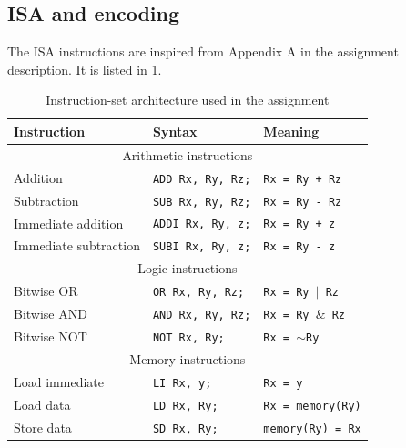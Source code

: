 \documentclass[a4paper, english]{article}
\numberwithin{equation}{section}
\begin{document}
\subsection{ISA and encoding}\label{sec:isa}
The ISA instructions are inspired from Appendix A in the assignment description. It is listed in \cref{tbl:ISA}.
\begin{table}[H]
    \centering
    \caption{Instruction-set architecture used in the assignment}\label{tbl:ISA}
    \begin{tabular}{lll}
        \toprule
        \textbf{Instruction}  & \textbf{Syntax}          & \textbf{Meaning}                  \\
        \midrule
        \multicolumn{3}{c}{Arithmetic instructions}                                          \\
        \midrule
        Addition              & \texttt{ADD Rx, Ry, Rz;} & \texttt{Rx = Ry + Rz}             \\
        Subtraction           & \texttt{SUB Rx, Ry, Rz;} & \texttt{Rx = Ry - Rz}             \\
        Immediate addition    & \texttt{ADDI Rx, Ry, z;} & \texttt{Rx = Ry + z}              \\
        Immediate subtraction & \texttt{SUBI Rx, Ry, z;} & \texttt{Rx = Ry - z}              \\
        \midrule
        \multicolumn{3}{c}{Logic instructions}                                               \\
        \midrule
        Bitwise OR            & \texttt{OR Rx, Ry, Rz;}  & \texttt{Rx = Ry \(\vert\) Rz}     \\
        Bitwise AND           & \texttt{AND Rx, Ry, Rz;} & \texttt{Rx = Ry \(\&\) Rz}        \\
        Bitwise NOT           & \texttt{NOT Rx, Ry;}     & \texttt{Rx = \(\sim\)Ry}          \\
        \midrule
        \multicolumn{3}{c}{Memory instructions}                                              \\
        \midrule
        Load immediate        & \texttt{LI Rx, y;}       & \texttt{Rx = y}                   \\
        Load data             & \texttt{LD Rx, Ry;}      & \texttt{Rx = memory(Ry)}          \\
        Store data            & \texttt{SD Rx, Ry;}      & \texttt{memory(Ry) = Rx}          \\

\end{tabular}
\end{table}
\end{document}
